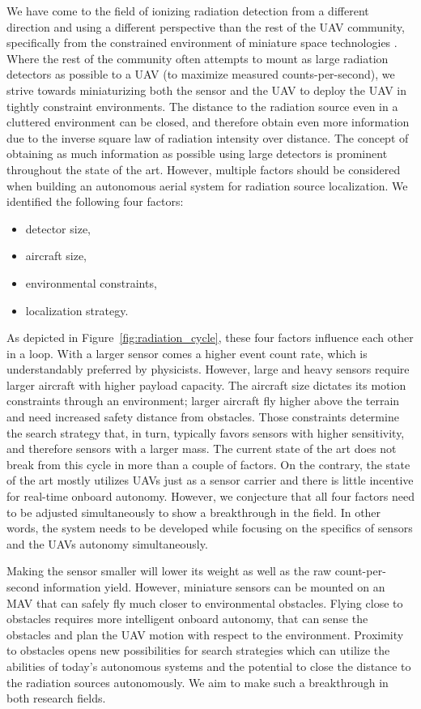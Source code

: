 \documentclass[a4paper,11pt,twoside,openright]{book}
\begin{document}
We have come to the field of ionizing radiation detection from a different direction and using a different perspective than the rest of the \ac{UAV} community, specifically from the constrained environment of miniature space technologies \cite{baca2016miniaturized, baca2018timepix}.
Where the rest of the community often attempts to mount as large radiation detectors as possible to a \ac{UAV} (to maximize measured counts-per-second), we strive towards miniaturizing both the sensor and the \ac{UAV} to deploy the \ac{UAV} in tightly constraint environments.
The distance to the radiation source even in a cluttered environment can be closed, and therefore obtain even more information due to the inverse square law of radiation intensity over distance.
The concept of obtaining as much information as possible using large detectors is prominent throughout the state of the art.
However, multiple factors should be considered when building an autonomous aerial system for radiation source localization.
We identified the following four factors:
\begin{itemize}
  \item detector size,
  \item aircraft size,
  \item environmental constraints,
  \item localization strategy.
\end{itemize}
As depicted in Figure~\ref{fig:radiation_cycle}, these four factors influence each other in a loop.
With a larger sensor comes a higher event count rate, which is understandably preferred by physicists.
However, large and heavy sensors require larger aircraft with higher payload capacity.
The aircraft size dictates its motion constraints through an environment; larger aircraft fly higher above the terrain and need increased safety distance from obstacles.
Those constraints determine the search strategy that, in turn, typically favors sensors with higher sensitivity, and therefore sensors with a larger mass.
The current state of the art does not break from this cycle in more than a couple of factors.
On the contrary, the state of the art mostly utilizes \acp{UAV} just as a sensor carrier and there is little incentive for real-time onboard autonomy.
However, we conjecture that all four factors need to be adjusted simultaneously to show a breakthrough in the field.
In other words, the system needs to be developed while focusing on the specifics of sensors and the \acp{UAV} autonomy simultaneously.

Making the sensor smaller will lower its weight as well as the raw count-per-second information yield.
However, miniature sensors can be mounted on an \ac{MAV} that can safely fly much closer to environmental obstacles.
Flying close to obstacles requires more intelligent onboard autonomy, that can sense the obstacles and plan the \ac{UAV} motion with respect to the environment.
Proximity to obstacles opens new possibilities for search strategies which can utilize the abilities of today's autonomous systems and the potential to close the distance to the radiation sources autonomously.
We aim to make such a breakthrough in both research fields.
\end{document}
